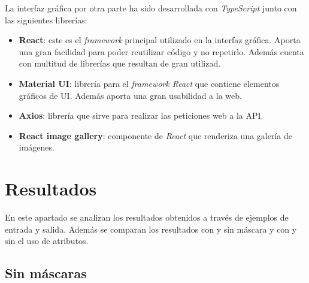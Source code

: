 \documentclass[12pt]{report} %
\begin{document}
	La interfaz gráfica por otra parte ha sido desarrollada con \textit{TypeScript} junto con las siguientes librerías:
	\begin{itemize}
		\item \textbf{React}: este es el \textit{framework} principal utilizado en la interfaz gráfica. Aporta una gran facilidad para
		poder reutilizar código y no repetirlo. Además cuenta con multitud de librerías que resultan de gran utilizad.
		\item \textbf{Material UI}: librería para el \textit{framework React} que contiene elementos gráficos de UI. Además aporta
		una gran usabilidad a la web. 
		\item \textbf{Axios}: librería que sirve para realizar las peticiones web a la API.
		\item \textbf{React image gallery}: componente de \textit{React} que renderiza una galería de imágenes.
	\end{itemize}

	\chapter{Resultados}

	En este apartado se analizan los resultados obtenidos a través de ejemplos de entrada
	y salida. Además se comparan los resultados con y sin máscara y con y sin el uso de atributos.


	\section{Sin máscaras}
\end{document}
